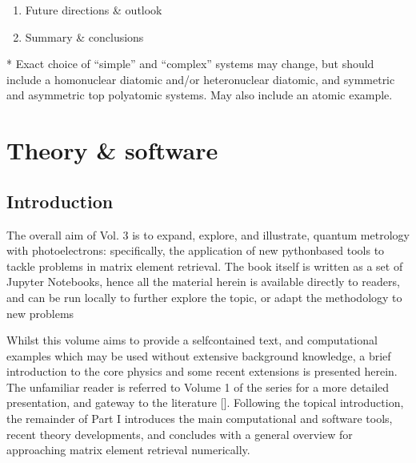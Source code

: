 \documentclass[letterpaper,10pt,english]{jupyterBook}
\begin{document}
\begin{enumerate}
\sphinxAtStartPar
c.  Direct molecular frame reconstruction via matrix\sphinxhyphen{}inversion
methods.

\sphinxAtStartPar
d.  Comparison of methods.

\sphinxAtStartPar
e.  Information content/quantum information analysis.

\item {} 
\sphinxAtStartPar
Future directions \& outlook

\item {} 
\sphinxAtStartPar
Summary \& conclusions

\end{enumerate}

\sphinxAtStartPar
* Exact choice of “simple” and “complex” systems may change, but should
include a homonuclear diatomic and/or heteronuclear diatomic, and
symmetric and asymmetric top polyatomic systems. May also include an
atomic example.

\sphinxstepscope


\part{Theory \& software}

\sphinxstepscope


\chapter{Introduction}
\label{\detokenize{part1/main_intro_051122:introduction}}\label{\detokenize{part1/main_intro_051122::doc}}
\sphinxAtStartPar
The overall aim of Vol. 3 is to expand, explore, and illustrate, quantum metrology with photoelectrons: specifically, the application of new python\sphinxhyphen{}based tools to tackle problems in matrix element retrieval. The book itself is written as a set of Jupyter Notebooks, hence all the material herein is available directly to readers, and can be run locally to further explore the topic, or adapt the methodology to new problems

\sphinxAtStartPar
Whilst this volume aims to provide a self\sphinxhyphen{}contained text, and computational examples which may be used without extensive background knowledge, a brief introduction to the core physics and some recent extensions is presented herein. The unfamiliar reader is referred to Volume 1 of the series for a more detailed presentation, and gateway to the literature {[}{]}. Following the topical introduction, the remainder of Part I introduces the main computational and software tools, recent theory developments, and concludes with a general overview for approaching matrix element retrieval numerically.
\end{document}
